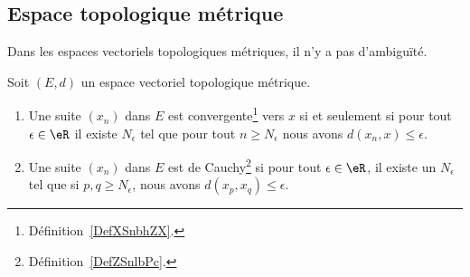 \subsection{Espace topologique métrique}

Dans les espaces vectoriels topologiques métriques, il n'y a pas d'ambiguïté.
\begin{proposition}     \label{PropooUEEOooLeIImr}
    Soit \( (E,d)\) un espace vectoriel topologique métrique.
    \begin{enumerate}
        \item   \label{ItemooROYMooAQCXnj}
            Une suite \( (x_n)\) dans \( E\) est convergente\footnote{Définition~\ref{DefXSnbhZX}.} vers \( x\) si et seulement si pour tout \( \epsilon\in \eR\) il existe \( N_{\epsilon}\) tel que pour tout \( n\geq N_{\epsilon}\) nous avons \( d(x_n,x)\leq \epsilon\).
        \item
            Une suite \( (x_n)\) dans \( E\) est de Cauchy\footnote{Définition~\ref{DefZSnlbPc}.} si pour tout \( \epsilon\in \eR\), il existe un \( N_{\epsilon}\) tel que si \( p,q\geq N_{\epsilon}\), nous avons \( d(x_p,x_q)\leq \epsilon\).
    \end{enumerate}
\end{proposition}

